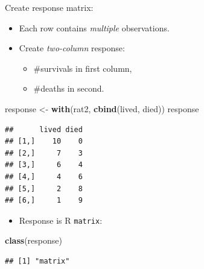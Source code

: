 \documentclass[ignorenonframetext,]{beamer}
\newenvironment{Shaded}{\begin{snugshade}}{\end{snugshade}}
\newcommand{\KeywordTok}[1]{\textcolor[rgb]{0.13,0.29,0.53}{\textbf{#1}}}
\newcommand{\NormalTok}[1]{#1}
\newcommand{\StringTok}[1]{\textcolor[rgb]{0.31,0.60,0.02}{#1}}
\providecommand{\tightlist}{%
  \setlength{\itemsep}{0pt}\setlength{\parskip}{0pt}}
\begin{document}
\begin{frame}[fragile]{Create response matrix:}
\protect\hypertarget{create-response-matrix}{}

\begin{itemize}
\tightlist
\item
  Each row contains \emph{multiple} observations.
\item
  Create \emph{two-column} response:

  \begin{itemize}
  \tightlist
  \item
    \#survivals in first column,
  \item
    \#deaths in second.
  \end{itemize}
\end{itemize}

\footnotesize

\begin{Shaded}
\begin{Highlighting}[]
\NormalTok{response <-}\StringTok{ }\KeywordTok{with}\NormalTok{(rat2, }\KeywordTok{cbind}\NormalTok{(lived, died))}
\NormalTok{response}
\end{Highlighting}
\end{Shaded}

\begin{verbatim}
##      lived died
## [1,]    10    0
## [2,]     7    3
## [3,]     6    4
## [4,]     4    6
## [5,]     2    8
## [6,]     1    9
\end{verbatim}

\normalsize

\begin{itemize}
\tightlist
\item
  Response is R \texttt{matrix}:
\end{itemize}

\footnotesize

\begin{Shaded}
\begin{Highlighting}[]
\KeywordTok{class}\NormalTok{(response)}
\end{Highlighting}
\end{Shaded}

\begin{verbatim}
## [1] "matrix"
\end{verbatim}

\normalsize

\end{frame}
\end{document}
